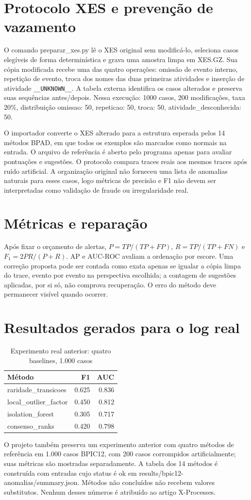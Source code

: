 \documentclass[conference]{IEEEtran}
\begin{document}
\section{Protocolo XES e prevenção de vazamento}
O comando preparar\_xes.py lê o XES original sem modificá-lo, seleciona casos elegíveis de forma determinística e grava uma amostra limpa em XES.GZ. Sua cópia modificada recebe uma das quatro operações: omissão de evento interno, repetição de evento, troca dos nomes das duas primeiras atividades e inserção de atividade \texttt{\_\_UNKNOWN\_\_}. A tabela externa identifica os casos alterados e preserva suas sequências antes/depois. Nessa execução: 1000 casos, 200 modificações, taxa 20\%, distribuição omissao: 50, repeticao: 50, troca: 50, atividade\_desconhecida: 50.

O importador converte o XES alterado para a estrutura esperada pelos 14 métodos BPAD, em que todos os exemplos são marcados como normais na entrada. O arquivo de referência é aberto pelo programa apenas para avaliar pontuações e sugestões. O protocolo compara traces reais aos mesmos traces após ruído artificial. A organização original não forneceu uma lista de anomalias naturais para esses casos, logo métricas de precisão e F1 não devem ser interpretadas como validação de fraude ou irregularidade real.

\section{Métricas e reparação}
Após fixar o orçamento de alertas, $P=TP/(TP+FP)$, $R=TP/(TP+FN)$ e $F_1=2PR/(P+R)$. AP e AUC-ROC avaliam a ordenação por escore. Uma correção proposta pode ser contada como exata apenas se igualar a cópia limpa do trace, evento por evento na perspectiva escolhida; a contagem de sugestões aplicadas, por si só, não comprova recuperação. O erro do método deve permanecer visível quando ocorrer.

\clearpage
\section{Resultados gerados para o log real}
\begin{table}[t]\centering\caption{Experimento real anterior: quatro baselines, 1.000 casos}\begin{tabular}{lrr}\toprule Método & F1 & AUC\\\midrule raridade\_transicoes & 0.625 & 0.836 \\
local\_outlier\_factor & 0.450 & 0.812 \\
isolation\_forest & 0.305 & 0.717 \\
consenso\_ranks & 0.420 & 0.798 \\ \bottomrule\end{tabular}\end{table}
O projeto também preserva um experimento anterior com quatro métodos de referência em 1.000 casos BPIC12, com 200 casos corrompidos artificialmente; suas métricas são mostradas separadamente. A tabela dos 14 métodos é construída com entradas cujo status é ok em results/bpic12-anomalias/summary.json. Métodos não concluídos não recebem valores substitutos. Nenhum desses números é atribuído ao artigo X-Processes.
\end{document}

